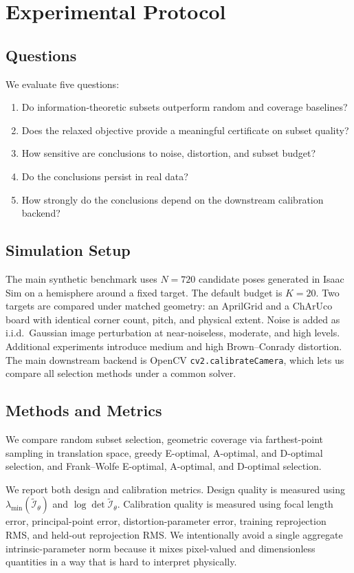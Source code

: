 \documentclass[11pt]{article}
\begin{document}
\section{Experimental Protocol}
\subsection{Questions}
We evaluate five questions:
\begin{enumerate}[leftmargin=1.5em]
    \item Do information-theoretic subsets outperform random and coverage
    baselines?
    \item Does the relaxed objective provide a meaningful certificate on subset
    quality?
    \item How sensitive are conclusions to noise, distortion, and subset budget?
    \item Do the conclusions persist in real data?
    \item How strongly do the conclusions depend on the downstream calibration
    backend?
\end{enumerate}

\subsection{Simulation Setup}
The main synthetic benchmark uses $N=720$ candidate poses generated in Isaac
Sim on a hemisphere around a fixed target. The default budget is $K=20$. Two
targets are compared under matched geometry: an AprilGrid and a ChArUco board
with identical corner count, pitch, and physical extent. Noise is added as
i.i.d.\ Gaussian image perturbation at near-noiseless, moderate, and high
levels. Additional experiments introduce medium and high Brown--Conrady
distortion. The main downstream backend is OpenCV
\texttt{cv2.calibrateCamera}, which lets us compare all selection methods under
a common solver.

\subsection{Methods and Metrics}
We compare random subset selection, geometric coverage via farthest-point
sampling in translation space, greedy E-optimal, A-optimal, and D-optimal
selection, and Frank--Wolfe E-optimal, A-optimal, and D-optimal selection.

We report both design and calibration metrics. Design quality is measured using
$\lambda_{\min}(\widetilde{\mathcal{I}}_\theta)$ and $\log\det
\widetilde{\mathcal{I}}_\theta$. Calibration quality is measured using focal
length error, principal-point error, distortion-parameter error, training
reprojection RMS, and held-out reprojection RMS. We intentionally avoid a
single aggregate intrinsic-parameter norm because it mixes pixel-valued and
dimensionless quantities in a way that is hard to interpret physically.
\end{document}
